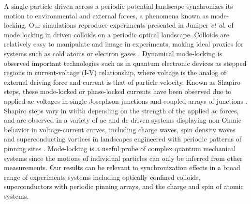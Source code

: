\documentclass[twocolumn,preprintnumbers,amsmath,amssymb,aps,prx]{revtex4}
\begin{document}
A single particle driven across a periodic potential landscape 
synchronizes its motion %
to environmental and external forces,
a phenomena known as mode-locking.  
Our simulations reproduce experiments presented in 
Juniper {\it et al.} \cite{Juniper2015} %
of 
mode locking in
driven colloids on a
periodic optical landscape.
Colloids are 
relatively easy to 
manipulate and image in experiments,
making ideal proxies 
for systems %
such as cold atoms or electron gases \cite{Grier2003}.
Dynamical mode-locking %
is %
observed important technologies such as 
in quantum electronic
devices %
as 
stepped regions in current-voltage (I-V) relationship,
where voltage is the analog of external driving force
and current is that of particle velocity.
Known as Shapiro steps, %
these mode-locked or phase-locked currents  
have been observed due to applied ac voltages in 
single Josephson junctions \cite{Shapiro1963, Golubov2004} and
coupled arrays of junctions \cite{Benz1990}.
Shapiro steps vary in width depending on the strength of the
applied ac forces,
and are observed in a variety of ac and dc driven systems
displaying
non-Ohmic behavior in voltage-current curves,
including
charge waves, spin density waves
and superconducting vortices in landscapes 
engineered with periodic patterns of pinning sites \cite{Reichhardt2000}.
Mode-locking is a useful probe 
of complex quantum mechanical systems
since the motions of individual particles can only be inferred
from other measurements.
Our results can be relevant 
to synchronization effects
in a broad range of experiments systems
including optically confined colloids,
superconductors with periodic pinning arrays, 
and the charge and spin of atomic systems.
\end{document}
